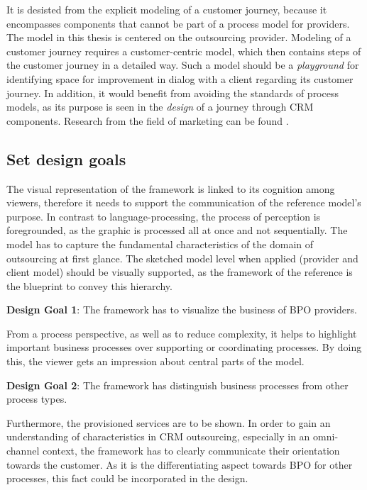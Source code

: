	It is desisted from the explicit modeling of a customer journey, because it encompasses components that cannot be part of a process model for providers. The model in this thesis is centered on the outsourcing provider. Modeling of a customer journey requires a customer-centric model, which then contains steps of the customer journey in a detailed way. Such a model should be a \textit{playground} for identifying space for improvement in dialog with a client regarding its customer journey. In addition, it would benefit from avoiding the standards of process models, as its purpose is seen in the \textit{design} of a journey through \acrshort{CRM} components. Research from the field of marketing can be found \citep{Lemon_2016, Frow_2007}. 
	
	\subsection{Set design goals}
	
	The visual representation of the framework is linked to its cognition among viewers, therefore it needs to support the communication of the reference model's purpose. In contrast to language-processing, the process of perception is foregrounded, as the graphic is processed all at once and not sequentially. The model has to capture the fundamental characteristics of the domain of outsourcing at first glance. The sketched model level when applied (provider and client model) should be visually supported, as the framework of the reference is the blueprint to convey this hierarchy. 
	
	\hfill\begin{minipage}{\dimexpr\textwidth-1.2cm}
		\textbf{Design Goal 1}: The framework has to visualize the business of BPO providers.
	\end{minipage}

From a process perspective, as well as to reduce complexity, it helps to highlight important business processes over supporting or coordinating processes. By doing this, the viewer gets an impression about central parts of the model. 

	\hfill\begin{minipage}{\dimexpr\textwidth-1.2cm}
	\textbf{Design Goal 2}: The framework has distinguish business processes from other process types. 
\end{minipage}

Furthermore, the provisioned services are to be shown. In order to gain an understanding of characteristics in CRM outsourcing, especially in an omni-channel context, the framework has to clearly communicate their orientation towards the customer. As it is the differentiating aspect towards BPO for other processes, this fact could be incorporated in the design.  

